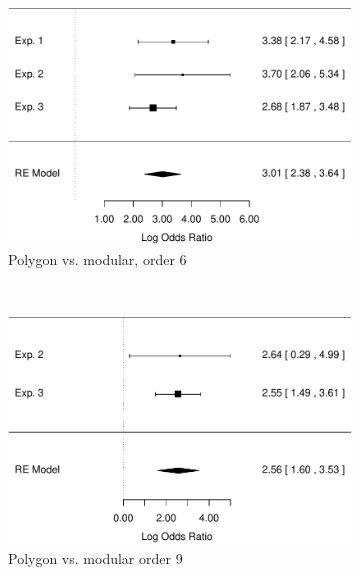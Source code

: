 \documentclass[man,10pt]{apa6}
\begin{document}
\begin{figure}
\centering
\begin{subfigure}[c]{0.4\textwidth}
\centering
\includegraphics[width=\textwidth]{figures/meta/question_typeinverse_zero_6_conditionpolygon.pdf}
\caption{Polygon vs. modular, order 6}
\end{subfigure}
~
\begin{subfigure}[c]{0.4\textwidth}
\centering
\includegraphics[width=\textwidth]{figures/meta/question_typeinverse_zero_9_conditionpolygon.pdf}
\caption{Polygon vs. modular order 9}
\end{subfigure} \\
\centering
\begin{subfigure}[c]{0.4\textwidth}
\centering

\end{subfigure}
\end{figure}
\end{document}
